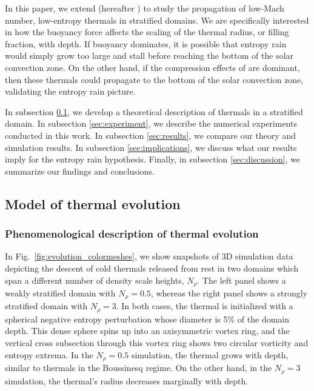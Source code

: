 In this paper, we extend \cite{lecoanet&jeevanjee2018} (hereafter \LJ) to study the propagation of low-Mach number, low-entropy thermals in stratified domains. 
We are specifically interested in how the buoyancy force affects the scaling of the thermal radius, or filling fraction, with depth. 
If buoyancy dominates, it is possible that entropy rain would simply grow too large and stall before reaching the bottom of the solar convection zone.
On the other hand, if the compression effects of \cite{brandenburg2016} are dominant, then these thermals could propagate to the bottom of the solar convection zone, validating the entropy rain picture.

In subsection \ref{sec:theory}, we develop a theoretical description of thermals in a stratified domain. 
In subsection \ref{sec:experiment}, we describe the numerical experiments conducted in this work. 
In subsection \ref{sec:results}, we compare our theory and simulation results. 
In subsection \ref{sec:implications}, we discuss what our results imply for the entropy rain hypothesis.
Finally, in subsection \ref{sec:discussion}, we summarize our findings and conclusions.

\subsection{Model of thermal evolution}
\label{sec:theory}

\subsubsection{Phenomenological description of thermal evolution}
In Fig.~\ref{fig:evolution_colormeshes}, we show snapshots of 3D simulation data depicting the descent of cold thermals released from rest in two domains which span a different number of density scale heights, $N_\rho$.
The left panel shows a weakly stratified domain with $N_\rho=0.5$, whereas the right panel shows a strongly stratified domain with $N_\rho=3$.
In both cases, the thermal is initialized with a spherical negative entropy perturbation whose diameter is 5\% of the domain depth.
This dense sphere spins up into an axisymmetric vortex ring, and the vertical cross subsection through this vortex ring shows two circular vorticity and entropy extrema.
In the $N_\rho = 0.5$ simulation, the thermal grows with depth, similar to thermals in the Boussinesq regime.
On the other hand, in the $N_\rho = 3$ simulation, the thermal's radius decreases marginally with depth.

